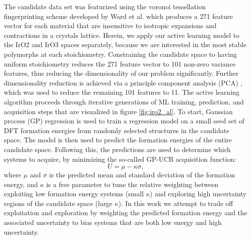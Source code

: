 The candidate data set was featurized using the voronoi tessellation fingerprinting scheme developed by Ward et al. \cite{Ward2017} which produces a 271 feature vector for each material that are insensitive to isotropic expansions and contractions in a crystals lattice.
Herein, we apply our active learning model to the IrO2 and IrO3 spaces separately, because we are interested in the most stable polymorphs at each stoichiometry. Constraining the candidate space to having uniform stoichiometry reduces the 271 feature vector to 101 non-zero variance features, thus reducing the dimensionality of our problem significantly.
Further dimensionality reduction is achieved via a principle component analysis (PCA) \cite{Tipping1999}, which was used to reduce the remaining 101 features to 11.
%
The active learning algorithm proceeds through iterative generations of ML training, prediction, and acquisition steps that are visualized in figure \ref{fig:iro2_al}.
To start, Gaussian process (GP) regression is used to train a regression model on a small seed set of DFT formation energies from randomly selected structures in the candidate space.
%
The model is then used to predict the formation energies of the entire candidate space.
%
Following this, the predictions are used to determine which systems to acquire, by minimizing the so-called GP-UCB acquisition function:
\begin{equation}
    U = \mu - \kappa \sigma,
\end{equation}
%
where $\mu$ and $\sigma$ is the predicted mean and standard deviation of the formation energy,
and $\kappa$ is a free parameter to tune the relative weighting between exploiting low formation energy systems (small $\kappa$) and exploring high uncertainty regions of the candidate space (large $\kappa$).
%
In this work we attempt to trade off exploitation and exploration by weighting the predicted formation energy and the associated uncertainty to bias systems that are both low energy and high uncertainty.
